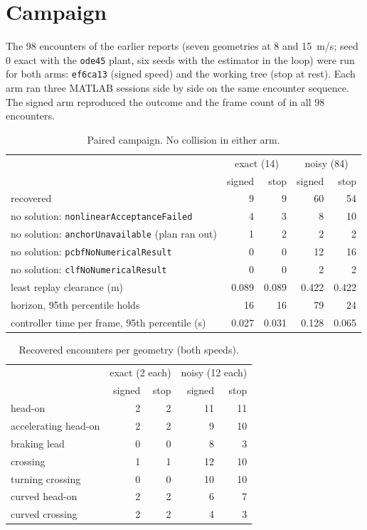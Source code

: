 \documentclass[11pt]{article}
\begin{document}
\section{Campaign}
The 98 encounters of the earlier reports (seven geometries at 8 and 15~m/s;
seed 0 exact with the \texttt{ode45} plant, six seeds with the estimator in
the loop) were run for both arms: \texttt{ef6ca13} (signed speed) and the
working tree (stop at rest). Each arm ran three MATLAB sessions side by side
on the same encounter sequence. The signed arm reproduced the outcome and the
frame count of  in all 98
encounters.

\begin{table}[h]
\centering\small
\caption{Paired campaign. No collision in either arm.}
\label{tab:campaign}
\begin{tabular}{lrrrr}
\toprule
 & \multicolumn{2}{c}{exact (14)} & \multicolumn{2}{c}{noisy (84)}\\
 & signed & stop & signed & stop\\
\midrule
recovered & 9 & 9 & 60 & 54\\
no solution: \texttt{nonlinearAcceptanceFailed} & 4 & 3 & 8 & 10\\
no solution: \texttt{anchorUnavailable} (plan ran out) & 1 & 2 & 2 & 2\\
no solution: \texttt{pcbfNoNumericalResult} & 0 & 0 & 12 & 16\\
no solution: \texttt{clfNoNumericalResult} & 0 & 0 & 2 & 2\\
least replay clearance (m) & 0.089 & 0.089 & 0.422 & 0.422\\
horizon, 95th percentile holds & 16 & 16 & 79 & 24\\
controller time per frame, 95th percentile (s) & 0.027 & 0.031 & 0.128 & 0.065\\
\bottomrule
\end{tabular}
\end{table}

\begin{table}[h]
\centering\small
\caption{Recovered encounters per geometry (both speeds).}
\label{tab:geometry}
\begin{tabular}{lrrrr}
\toprule
 & \multicolumn{2}{c}{exact (2 each)} & \multicolumn{2}{c}{noisy (12 each)}\\
 & signed & stop & signed & stop\\
\midrule
head-on & 2 & 2 & 11 & 11\\
accelerating head-on & 2 & 2 & 9 & 10\\
braking lead & 0 & 0 & 8 & 3\\
crossing & 1 & 1 & 12 & 10\\
turning crossing & 0 & 0 & 10 & 10\\
curved head-on & 2 & 2 & 6 & 7\\
curved crossing & 2 & 2 & 4 & 3\\
\bottomrule
\end{tabular}
\end{table}
\end{document}
